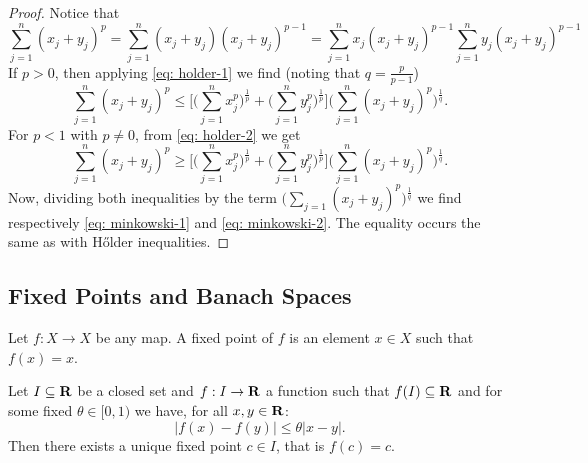 \begin{proof}
    Notice that
    \[
        \sum_{j=1}^n (x_j + y_j)^p = \sum_{j=1}^n (x_j + y_j)(x_j + y_j)^{p-1}
        = \sum_{j=1}^n x_j (x_j + y_j)^{p-1} \sum_{j=1}^n y_j (x_j + y_j)^{p-1}
    \]
    If \(p > 0\), then applying \cref{eq: holder-1} we find (noting that \(q =
    \frac p {p - 1}\))
    \[
        \sum_{j=1}^n (x_j + y_j)^p \leq \Big[
            \Big(\sum_{j=1}^n x_j^p\Big)^{\frac 1 p}
            + \Big(\sum_{j=1}^n y_j^p\Big)^{\frac 1 p}
            \Big] \Big(\sum_{j=1}^n (x_j + y_j)^p\Big)^{\frac 1 q}.
    \]
    For \(p < 1\) with \(p \neq 0\), from \cref{eq: holder-2} we get
    \[
        \sum_{j=1}^n (x_j + y_j)^p \geq \Big[
            \Big(\sum_{j=1}^n x_j^p\Big)^{\frac 1 p}
            + \Big(\sum_{j=1}^n y_j^p\Big)^{\frac 1 p}
            \Big] \Big(\sum_{j=1}^n (x_j + y_j)^p\Big)^{\frac 1 q}.
    \]
    Now, dividing both inequalities by the term \(\Big(\sum_{j=1} (x_j + y_j)^p
    \Big)^{\frac 1 q}\) we find respectively \cref{eq: minkowski-1} and
    \cref{eq: minkowski-2}. The equality occurs the same as with H\H{o}lder
    inequalities.
\end{proof}

\subsection{Fixed Points and Banach Spaces}

\begin{definition}\label{def:fixed-point}
    Let \(f: X \to X\) be any map. A fixed point of \(f\) is an element \(x \in X\)
    such that \(f(x) = x\).
\end{definition}

\begin{theorem}\label{thm: fixed point}
    Let \(I \subseteq \mathbf{R}\) be a closed set and \(f: I \to \mathbf{R}\) a
    function such that \(f(I) \subseteq \mathbf{R}\) and for some fixed \(\theta
    \in [0, 1)\) we have, for all \(x, y \in \mathbf{R}\):
    \[
        |f(x) - f(y)| \leq \theta |x - y|.
    \]
    Then there exists a unique fixed point \(c \in I\), that is \(f(c) = c\).
\end{theorem}

